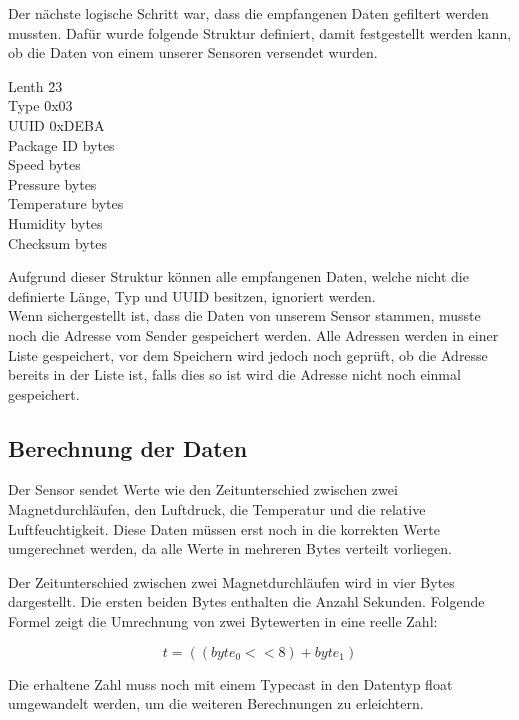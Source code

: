 Der nächste logische Schritt war, dass die empfangenen Daten gefiltert werden mussten. Dafür wurde folgende Struktur definiert, damit festgestellt werden kann, ob die Daten von einem unserer Sensoren versendet wurden.

\begin{tabbing}
    Lenth\hspace{1cm} \quad\=		23\\[0.8ex]
    Type\>				0x03\\
    UUID\>				0xDEBA\\
	Package ID bytes\\
	Speed bytes\\
	Pressure bytes\\
	Temperature bytes\\
	Humidity bytes\\
	Checksum bytes\\
\end{tabbing}
Aufgrund dieser Struktur können alle empfangenen Daten, welche nicht die definierte Länge, Typ und UUID besitzen, ignoriert werden.\\

Wenn sichergestellt ist, dass die Daten von unserem Sensor stammen, musste noch die Adresse vom Sender gespeichert werden. Alle Adressen werden in einer Liste gespeichert, vor dem Speichern wird jedoch noch geprüft, ob die Adresse bereits in der Liste ist, falls dies so ist wird die Adresse nicht noch einmal gespeichert.

\subsection{Berechnung der Daten}

Der Sensor sendet Werte wie den Zeitunterschied zwischen zwei Magnetdurchläufen, den Luftdruck, die Temperatur und die relative Luftfeuchtigkeit. Diese Daten müssen erst noch in die korrekten Werte umgerechnet werden, da alle Werte in mehreren Bytes verteilt vorliegen.

Der Zeitunterschied zwischen zwei Magnetdurchläufen wird in vier Bytes dargestellt. Die ersten beiden Bytes enthalten die Anzahl Sekunden. Folgende Formel zeigt die Umrechnung von zwei Bytewerten in eine reelle Zahl:

\begin{equation}
	t = ((byte_0 << 8) + byte_1)
\end{equation}

Die erhaltene Zahl muss noch mit einem Typecast in den Datentyp float umgewandelt werden, um die weiteren Berechnungen zu erleichtern.

